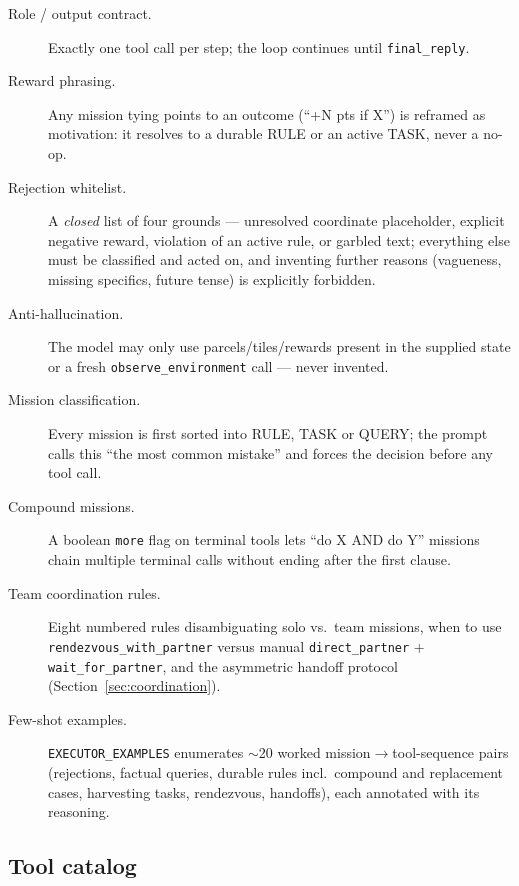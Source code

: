 \documentclass[11pt,a4paper]{article}
\begin{document}
\begin{description}
  \item[Role / output contract.] Exactly one tool call per step; the loop continues until
  \texttt{final\_reply}.
  \item[Reward phrasing.] Any mission tying points to an outcome (``+N pts if X'') is reframed
  as motivation: it resolves to a durable RULE or an active TASK, never a no-op.
  \item[Rejection whitelist.] A \emph{closed} list of four grounds --- unresolved coordinate
  placeholder, explicit negative reward, violation of an active rule, or garbled text; everything
  else must be classified and acted on, and inventing further reasons (vagueness, missing
  specifics, future tense) is explicitly forbidden.
  \item[Anti-hallucination.] The model may only use parcels/tiles/rewards present in the
  supplied state or a fresh \texttt{observe\_environment} call --- never invented.
  \item[Mission classification.] Every mission is first sorted into RULE, TASK or QUERY; the
  prompt calls this ``the most common mistake'' and forces the decision before any tool call.
  \item[Compound missions.] A boolean \texttt{more} flag on terminal tools lets ``do X AND do
  Y'' missions chain multiple terminal calls without ending after the first clause.
  \item[Team coordination rules.] Eight numbered rules disambiguating solo vs.\ team missions,
  when to use \texttt{rendezvous\_with\_}\allowbreak\texttt{partner} versus manual \texttt{direct\_partner} +
  \texttt{wait\_for\_partner}, and the asymmetric handoff protocol (Section~\ref{sec:coordination}).
  \item[Few-shot examples.] \texttt{EXECUTOR\_EXAMPLES} enumerates $\sim$20 worked
  mission$\to$tool-sequence pairs (rejections, factual queries, durable rules incl.\ compound and
  replacement cases, harvesting tasks, rendezvous, handoffs), each annotated with its reasoning.
\end{description}

\subsection{Tool catalog}
\end{document}
